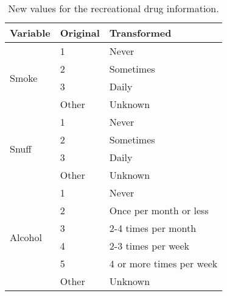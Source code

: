 \begin{table}[H]
	\centering

    \label{table:Table_RecreationalDrug_Info_Transform_Categories}
    
	\renewcommand{\arraystretch}{1.5}

    \begin{tabular}{l | l | l}
		\hline
        \rowcolor[HTML]{FF9999}		
		
        \textbf{Variable} & \textbf{Original} & \textbf{Transformed} \\ 		
        
        \hline 
                                    
            \multirow{4}{*}{Smoke}   & \multicolumn{1}{l}{1}     & \multicolumn{1}{l}{Never}     \\\cline{2-3}
                                     & \multicolumn{1}{l}{2}     & \multicolumn{1}{l}{Sometimes} \\\cline{2-3}
                                     & \multicolumn{1}{l}{3}     & \multicolumn{1}{l}{Daily}     \\\cline{2-3}
                                     & \multicolumn{1}{l}{Other} & \multicolumn{1}{l}{Unknown}   \\\hline
                                    
            \multirow{4}{*}{Snuff}   & \multicolumn{1}{l}{1}     & \multicolumn{1}{l}{Never}     \\\cline{2-3}
                                     & \multicolumn{1}{l}{2}     & \multicolumn{1}{l}{Sometimes} \\\cline{2-3}
                                     & \multicolumn{1}{l}{3}     & \multicolumn{1}{l}{Daily}     \\\cline{2-3}
                                     & \multicolumn{1}{l}{Other} & \multicolumn{1}{l}{Unknown}   \\\hline

            \multirow{6}{*}{Alcohol} & \multicolumn{1}{l}{1}     & \multicolumn{1}{l}{Never}                    \\\cline{2-3}
                                     & \multicolumn{1}{l}{2}     & \multicolumn{1}{l}{Once per month or less}   \\\cline{2-3}
                                     & \multicolumn{1}{l}{3}     & \multicolumn{1}{l}{2-4 times per month}      \\\cline{2-3}
                                     & \multicolumn{1}{l}{4}     & \multicolumn{1}{l}{2-3 times per week}       \\\cline{2-3}
                                     & \multicolumn{1}{l}{5}     & \multicolumn{1}{l}{4 or more times per week} \\\cline{2-3}
                                     & \multicolumn{1}{l}{Other} & \multicolumn{1}{l}{Unknown}   \\\hline

        \end{tabular}

    \caption{New values for the recreational drug information.}

\end{table}



